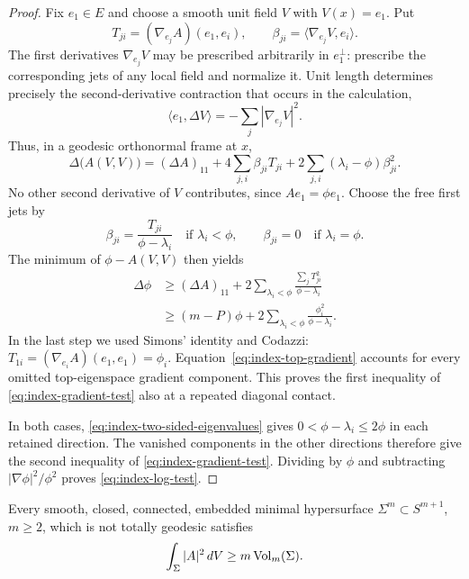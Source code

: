 \begin{proof}
Fix $e_1\in E$ and choose a smooth unit field $V$ with $V(x)=e_1$.
Put
\[
 T_{ji}=(\nabla_{e_j}A)(e_1,e_i),\qquad
 \beta_{ji}=\langle\nabla_{e_j}V,e_i\rangle.
\]
The first derivatives $\nabla_{e_j}V$ may be prescribed arbitrarily in
$e_1^\perp$: prescribe the corresponding jets of any local field and
normalize it.  Unit length determines precisely the second-derivative
contraction that occurs in the calculation,
\[
 \langle e_1,\Delta V\rangle
       =-\sum_j|\nabla_{e_j}V|^2.
\]
Thus, in a geodesic orthonormal frame at $x$,
\begin{equation}\label{eq:index-unit-field-laplacian}
 \Delta\bigl(A(V,V)\bigr)
  =(\Delta A)_{11}
    +4\sum_{j,i}\beta_{ji}T_{ji}
    +2\sum_{j,i}(\lambda_i-\phi)\beta_{ji}^2.
\end{equation}
No other second derivative of $V$ contributes, since $Ae_1=\phi e_1$.
Choose the free first jets by
\[
 \beta_{ji}=\frac{T_{ji}}{\phi-\lambda_i}
       \quad\text{if }\lambda_i<\phi,
 \qquad
 \beta_{ji}=0\quad\text{if }\lambda_i=\phi.
\]
The minimum of $\phi-A(V,V)$ then yields
\begin{align*}
 \Delta\phi
 &\ge(\Delta A)_{11}
       +2\sum_{\lambda_i<\phi}
                    \frac{\sum_jT_{ji}^2}{\phi-\lambda_i}\\
 &\ge(m-P)\phi
       +2\sum_{\lambda_i<\phi}
                    \frac{\phi_i^2}{\phi-\lambda_i}.
\end{align*}
In the last step we used Simons' identity and Codazzi:
$T_{1i}=(\nabla_{e_i}A)(e_1,e_1)=\phi_i$.
Equation~\eqref{eq:index-top-gradient} accounts for every omitted
top-eigenspace gradient component.  This proves the first inequality of
\eqref{eq:index-gradient-test} also at a repeated diagonal contact.

In both cases, \eqref{eq:index-two-sided-eigenvalues} gives
$0<\phi-\lambda_i\le2\phi$ in each retained direction.  The vanished
components in the other directions therefore give the second inequality
of \eqref{eq:index-gradient-test}.  Dividing by $\phi$ and subtracting
$|\nabla\phi|^2/\phi^2$ proves \eqref{eq:index-log-test}.
\end{proof}

\begin{theorem}\label{thm:curvature-average}
Every smooth, closed, connected, embedded minimal hypersurface
$\Sigma^m\subset S^{m+1}$, $m\ge2$, which is not totally geodesic satisfies
\begin{equation}\label{eq:index-curvature-average}
 \int_\Sigma |A|^2\,dV\ge m\operatorname{Vol}_m(\Sigma).
\end{equation}
\end{theorem}

